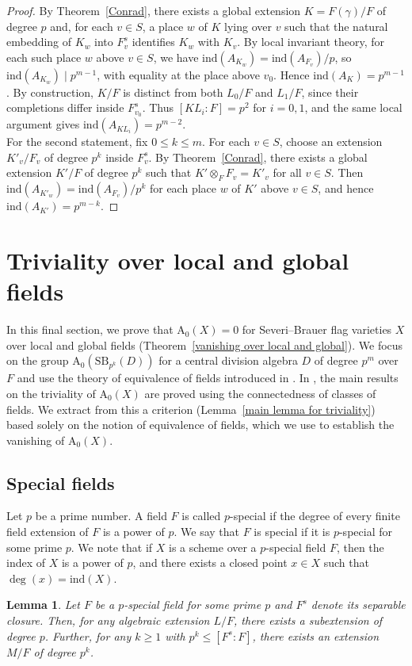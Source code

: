 \documentclass[10pt]{amsart}
\theoremstyle{plain}
\newtheorem{lemma}[thm]{Lemma}
\theoremstyle{definition}
\begin{document}
\begin{proof}
By Theorem~\ref{Conrad}, there exists a global extension \(K=F(\gamma)/F\) of degree \(p\) and, for each \(v \in S\), a place \(w\) of \(K\) lying over \(v\) such that the natural embedding of \(K_w\) into \(F_v^s\) identifies \(K_w\) with \(K_v\). By local invariant theory, for each such place \(w\) above \(v \in S\), we have \(\mathrm{ind}(A_{K_w}) = \mathrm{ind}(A_{F_v})/p\), so \(\mathrm{ind}(A_{K_w}) \mid p^{m-1}\), with equality at the place above \(v_0\). Hence \(\mathrm{ind}(A_K)=p^{m-1}\). By construction, \(K/F\) is distinct from both \(L_0/F\) and \(L_1/F\), since their completions differ inside \(F_{v_0}^s\). Thus \([KL_i:F]=p^2\) for \(i=0,1\), and the same local argument gives \(\mathrm{ind}(A_{KL_i})=p^{m-2}\).\\
For the second statement, fix \(0 \le k \le m\). For each \(v \in S\), choose an extension \(K'_v/F_v\) of degree \(p^k\) inside \(F_v^s\). By Theorem~\ref{Conrad}, there exists a global extension \(K'/F\) of degree \(p^k\) such that \(K' \otimes_F F_v = K'_v\) for all \(v \in S\). Then \(\mathrm{ind}(A_{K'_w}) = \mathrm{ind}(A_{F_v})/p^k\) for each place \(w\) of \(K'\) above \(v \in S\), and hence \(\mathrm{ind}(A_{K'})=p^{m-k}\).
\end{proof}


\section{Triviality over local and global fields}\label{proof of Vanishing theorem}
In this final section, we prove that \(\mathrm{A_0}(X)=0\) for Severi--Brauer flag varieties \(X\) over local and global fields (Theorem~\ref{vanishing over local and global}). We focus on the group \(\mathrm{A_0}(\mathrm{SB}_{p^k}(D))\) for a central division algebra \(D\) of degree \(p^m\) over \(F\) and use the theory of equivalence of fields introduced in \cite{MC}. In \cite{MC}, the main results on the triviality of \(\mathrm{A_0}(X)\) are proved using the connectedness of classes of fields. We extract from this a criterion (Lemma~\ref{main lemma for triviality}) based solely on the notion of equivalence of fields, which we use to establish the vanishing of \(\mathrm{A_0}(X)\).
\subsection{Special fields \cite[Section 5]{MC}} 
Let \(p\) be a prime number. A field \(F\) is called \(p\)-special if the degree of every finite field extension of \(F\) is a power of \(p\). We say that \(F\) is special if it is \(p\)-special for some prime \(p\). We note that if \(X\) is a scheme over a \(p\)-special field \(F\), then the index of \(X\) is a power of \(p\), and there exists a closed point \(x \in X\) such that \(\deg(x) = \mathrm{ind}(X)\). 
\begin{lemma}\label{p-degree in special field}
Let \(F\) be a \(p\)-special field for some prime \(p\) and \(F^s\) denote its separable closure. Then, for any algebraic extension \(L/F\), there exists a subextension of degree \(p\). Further, for any \(k \geq 1\) with \(p^k \leq [F^s:F]\), there exists an extension \(M/F\) of degree \(p^k\).
\end{lemma}
\end{document}
